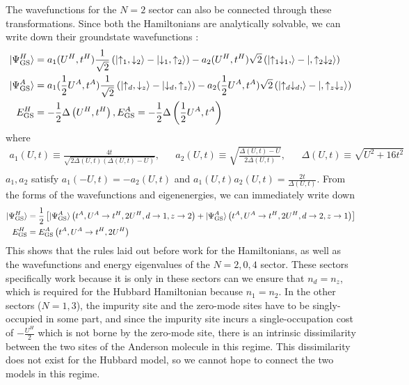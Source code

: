 \documentclass[12pt]{article}
\numberwithin{equation}{section}
\begin{document}
The wavefunctions for the \(N=2\) sector can also be connected through these transformations. Since both the Hamiltonians are analytically solvable, we can write down their groundstate wavefunctions \cite{pavarini}:
\begin{equation}\begin{aligned}
	\ket{\Psi^H_\text{GS}} &= a_1(U^H, t^H)\frac{1}{\sqrt 2}\left(\ket{\uparrow_1, \downarrow_2} - \ket{\downarrow_1, \uparrow_2}\right) - a_2(U^H,t^H){\sqrt 2}\left(\ket{\uparrow_1\downarrow_1, } - \ket{,\uparrow_2\downarrow_2}\right)\\
	\ket{\Psi^A_\text{GS}} &= a_1(\frac{1}{2}U^A, t^A)\frac{1}{\sqrt 2}\left(\ket{\uparrow_d, \downarrow_z} - \ket{\downarrow_d, \uparrow_z}\right) - a_2(\frac{1}{2}U^A,t^A){\sqrt 2}\left(\ket{\uparrow_d\downarrow_d, } - \ket{,\uparrow_z\downarrow_z}\right)\\
	E^H_\text{GS} &=  -\frac{1}{2}\Delta\left( U^H, t^H \right), E^A_\text{GS} =  -\frac{1}{2}\Delta\left( \frac{1}{2}U^A, t^A \right)
\end{aligned}\end{equation}
where 
\begin{equation}\begin{aligned}
	a_1(U,t) \equiv \frac{4t}{\sqrt{2\Delta(U,t)\left( \Delta(U,t) - U \right) }}, && a_2(U,t) \equiv \sqrt{\frac{\Delta(U,t) - U}{2\Delta(U,t)}}, &&\Delta(U,t) \equiv \sqrt{U^2 + 16t^2}\\
\end{aligned}\end{equation}
$a_1,a_2$ satisfy $a_1(-U,t) = -a_2(U,t)$ and $a_1(U,t)a_2(U,t)= \frac{2t}{\Delta(U,t)}$.
From the forms of the wavefunctions and eigenenergies, we can immediately write down
\begin{equation}\begin{aligned}
	\ket{\Psi^H_\text{GS}} &= \frac{1}{2}\left[\ket{\Psi^A_\text{GS}}\left(t^A, U^A \to t^H, 2U^H, d \to 1, z \to 2\right) + \ket{\Psi^A_\text{GS}}\left(t^A, U^A \to t^H, 2U^H, d \to 2, z \to 1\right)\right]\\
	E^H_\text{GS} &= E^A_\text{GS}\left(t^A, U^A \to t^H, 2U^H\right)
\end{aligned}\end{equation}
This shows that the rules laid out before work for the Hamiltonians, as well as the wavefunctions and energy eigenvalues of the \(N=2,0,4\) sector. These sectors specifically work because it is only in these sectors can we ensure that \(n_d = n_z\), which is required for the Hubbard Hamiltonian because \(n_1 = n_2\). In the other sectors (\(N=1,3\)), the impurity site and the zero-mode sites have to be singly-occupied in some part, and since the impurity site incurs a single-occupation cost of \(-\frac{U^H}{2}\) which is not borne by the zero-mode site, there is an intrinsic dissimilarity between the two sites of the Anderson molecule in this regime. This dissimilarity does not exist for the Hubbard model, so we cannot hope to connect the two models in this regime.
\end{document}

